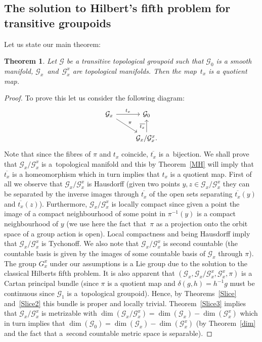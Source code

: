 \documentclass[pdftex]{sigma}
\newtheorem{tw}{Theorem}[section]
\begin{document}
\subsection{The solution to Hilbert's fifth problem for transitive groupoids}
Let us state our main theorem:
\begin{tw} Let $\mathcal{G}$ be a transitive topological groupoid such that $\mathcal{G}_0$ is a smooth manifold, $\mathcal{G}_x$~and~$\mathcal{G}^x_x$ are topological manifolds. Then the map~$t_x$ is a quotient map.
\end{tw}
\begin{proof} To prove this let us consider the following diagram:
\begin{equation*}
\begin{tikzcd}
\mathcal{G}_x \arrow[rd, "\pi"] \arrow[r, "t_x"] & \mathcal{G}_0 \\
& \mathcal{G}_x\slash\mathcal{G}^x_x.\arrow[u, "\overline{t_x}"]
\end{tikzcd}
\end{equation*}
Note that since the fibres of $\pi$ and $t_x$ coincide, $\overline{t_x}$ is a~bijection. We shall prove that $\mathcal{G}_x\slash\mathcal{G}_x^x$ is a~topological manifold and this by Theorem~\ref{MH} will imply that $\overline{t_x}$ is a homeomorphism which in turn implies that $t_x$ is a quotient map. First of all we observe that $\mathcal{G}_x\slash\mathcal{G}_x^x$ is Hausdorff (given two points $y,z\in\mathcal{G}_x\slash\mathcal{G}_x^x$ they can be separated by the inverse images through $\overline{t_x}$ of the open sets separating $\overline{t_x}(y)$ and $\overline{t_x}(z)$). Furthermore, $\mathcal{G}_x\slash\mathcal{G}_x^x$ is locally compact since given a point  the image of a compact neighbourhood of some point in $\pi^{-1}(y)$ is a compact neighbourhood of $y$ (we use here the fact that~$\pi$ as a projection onto the orbit space of a group action is open). Local compactness and being Hausdorff imply that $\mathcal{G}_x\slash\mathcal{G}_x^x$ is Tychonoff. We also note that $\mathcal{G}_x\slash\mathcal{G}_x^x$ is second countable (the countable basis is given by the images of some countable basis of $\mathcal{G}_x$ through $\pi$). The group $G^x_x$ under our assumptions is a Lie group due to the solution to the classical Hilberts fifth problem. It is also apparent that $(\mathcal{G}_x,\mathcal{G}_x\slash\mathcal{G}_x^x,\mathcal{G}_x^x,\pi)$ is a Cartan principal bundle (since $\pi$ is a quotient map and $\delta(g,h)=h^{-1}g$ must be continuous since $\mathcal{G}_1$ is a~topological groupoid). Hence, by Theorems~\ref{Slice} and~\ref{Slice2} this bundle is proper and locally trivial. Theorem~\ref{Slice3} implies that $\mathcal{G}_x\slash\mathcal{G}_x^x$ is metrizable with $\dim(\mathcal{G}_x\slash\mathcal{G}_x^x)=\dim(\mathcal{G}_x)-\dim(\mathcal{G}_x^x)$ which in turn implies that $\dim(\mathcal{G}_0)= \dim(\mathcal{G}_x)-\dim(\mathcal{G}_x^x)$ (by Theorem~\ref{dim} and the fact that a~second countable metric space is separable).


\end{proof}
\end{document}
